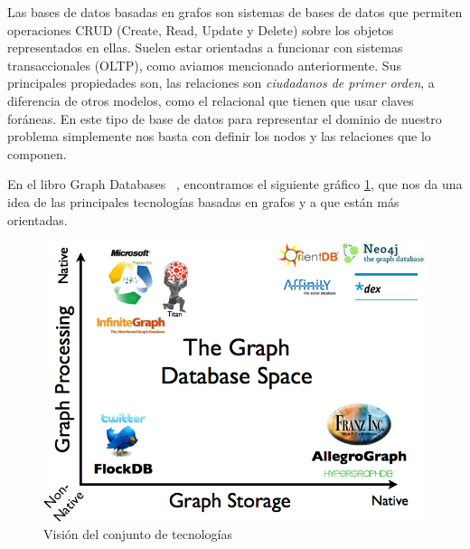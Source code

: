 \documentclass[12pt]{article} %
\begin{document}
\noindent{}

Las bases de datos basadas en grafos son sistemas de bases de datos que permiten operaciones CRUD (Create, Read, Update y Delete) sobre los objetos representados en ellas. Suelen estar orientadas a funcionar con sistemas transaccionales (OLTP), como aviamos mencionado anteriormente. Sus principales propiedades son, las relaciones son \textit{ciudadanos de primer orden}, a diferencia de otros modelos, como el relacional que tienen que usar claves foráneas. En este tipo de base de datos para representar el dominio de nuestro problema simplemente nos basta con definir los nodos y las relaciones que lo componen. 

En el libro Graph Databases ~\cite{graphdbbook}, encontramos el siguiente gráfico \ref{fig:grdb}, que nos da una idea de las principales tecnologías basadas en grafos y a que están más orientadas.

\begin{figure}[ht!]
\center
\includegraphics{add/grdb.png}
\caption{Visión del conjunto de tecnologías}
\label{fig:grdb}
\end{figure}
\end{document}

